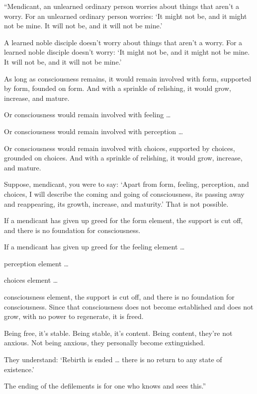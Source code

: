 \documentclass[12pt,openany]{book}%
\begin{document}
“Mendicant, an unlearned ordinary person worries about things that aren’t a worry. For an unlearned ordinary person worries: ‘It might not be, and it might not be mine. It will not be, and it will not be mine.’ 

A learned noble disciple doesn’t worry about things that aren’t a worry. For a learned noble disciple doesn’t worry: ‘It might not be, and it might not be mine. It will not be, and it will not be mine.’ 

As long as consciousness remains, it would remain involved with form, supported by form, founded on form. And with a sprinkle of relishing, it would grow, increase, and mature. 

Or consciousness would remain involved with feeling … 

Or consciousness would remain involved with perception … 

Or consciousness would remain involved with choices, supported by choices, grounded on choices. And with a sprinkle of relishing, it would grow, increase, and mature. 

Suppose, mendicant, you were to say: ‘Apart from form, feeling, perception, and choices, I will describe the coming and going of consciousness, its passing away and reappearing, its growth, increase, and maturity.’ That is not possible. 

If a mendicant has given up greed for the form element, the support is cut off, and there is no foundation for consciousness. 

If a mendicant has given up greed for the feeling element … 

perception element … 

choices element … 

consciousness element, the support is cut off, and there is no foundation for consciousness. Since that consciousness does not become established and does not grow, with no power to regenerate, it is freed. 

Being free, it’s stable. Being stable, it’s content. Being content, they’re not anxious. Not being anxious, they personally become extinguished. 

They understand: ‘Rebirth is ended … there is no return to any state of existence.’ 

The ending of the defilements is for one who knows and sees this.” 
\end{document}
